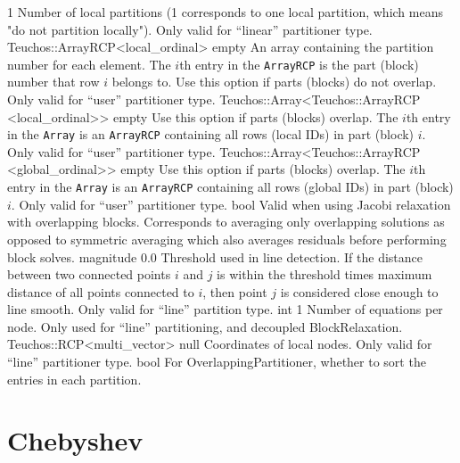     {1}
    {Number of local partitions (1 corresponds to one local partition, which
     means "do not partition locally"). Only valid for ``linear'' partitioner
     type.}
    {Teuchos::ArrayRCP<local\_ordinal>}
    {empty}
    {An array containing the partition number for each element.
     The $i$th entry in the \texttt{ArrayRCP} is the part (block) number that
     row $i$ belongs to. Use this option if parts (blocks) do not
     overlap. Only valid for ``user'' partitioner type.}
    {Teuchos::Array<Teuchos::ArrayRCP\\<local\_ordinal>>}
    {empty}
    {Use this option if parts (blocks) overlap. The $i$th entry in the
     \texttt{Array} is an \texttt{ArrayRCP} containing all rows (local IDs) in part
     (block) $i$. Only valid for ``user'' partitioner type.}
    {Teuchos::Array<Teuchos::ArrayRCP\\<global\_ordinal>>}
    {empty}
    {Use this option if parts (blocks) overlap. The $i$th entry in the
     \texttt{Array} is an \texttt{ArrayRCP} containing all rows (global IDs) in part
     (block) $i$. Only valid for ``user'' partitioner type.}
    {bool}
    {\false}
    {Valid when using Jacobi relaxation with overlapping blocks.
     Corresponds to averaging only overlapping solutions as opposed
     to symmetric averaging which also averages residuals before performing block solves.}
    {magnitude}
    {0.0}
    {Threshold used in line detection. If the distance between two connected
     points $i$ and $j$ is within the threshold times maximum distance of all
     points connected to $i$, then point $j$ is considered close enough to line
     smooth. Only valid for ``line'' partition type.}
    {int}
    {1}
    {Number of equations per node. Only used for ``line'' partitioning, and
     decoupled BlockRelaxation.}
    {Teuchos::RCP<multi\_vector>}
    {null}
    {Coordinates of local nodes. Only valid for ``line'' partitioner type.}
    {bool}
    {\false}
    {For OverlappingPartitioner, whether to sort the entries in each partition.}

\section{Chebyshev}\label{s:Chebyshev}

